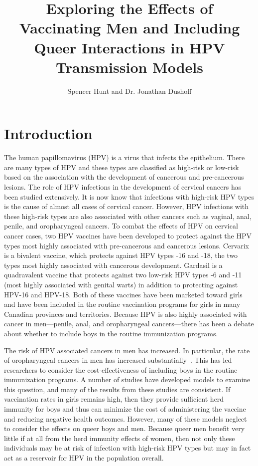 \documentclass[12pt]{article}
\title{Exploring the Effects of Vaccinating Men and Including Queer Interactions in HPV Transmission Models}
\author{Spencer Hunt and Dr. Jonathan Dushoff}
\begin{document}
\maketitle

\section{Introduction}

The human papillomavirus (HPV) is a virus that infects the epithelium.  There are many types of HPV and these types are classified as high-risk or low-risk based on the association with the development of cancerous and pre-cancerous lesions.  The role of HPV infections in the development of cervical cancers has been studied extensively.  It is now know that infections with high-risk HPV types is the cause of almost all cases of cervical cancer.  However, HPV infections with these high-risk types are also associated with other cancers such as vaginal, anal, penile, and oropharyngeal cancers.  To combat the effects of HPV on cervical cancer cases, two HPV vaccines have been developed to protect against the HPV types most highly associated with pre-cancerous and cancerous lesions. Cervarix is a bivalent vaccine, which protects against HPV types -16 and -18, the two types most highly associated with cancerous development.  Gardasil is a quadravalent vaccine that protects against two low-risk HPV types -6 and -11 (most highly associated with genital warts) in addition to protecting against HPV-16 and HPV-18.  Both of these vaccines have been marketed toward girls and have been included in the routine vaccination programs for girls in many Canadian provinces and territories.  Because HPV is also highly associated with cancer in men---penile, anal, and oropharyngeal cancers---there has been a debate about whether to include boys in the routine immunization programs.  

The risk of HPV associated cancers in men has increased. In particular, the rate of oropharyngeal cancers in men has increased substantially~\cite{}.  This has led researchers to consider the cost-effectiveness of including boys in the routine immunization programs.  A number of studies have developed models to examine this question, and many of the results from these studies are consistent.  If vaccination rates in girls remains high, then they provide sufficient herd immunity for boys and thus can minimize the cost of administering the vaccine and reducing negative health outcomes.  However, many of these models neglect to consider the effects on queer boys and men.  Because queer men benefit very little if at all from the herd immunity effects of women, then not only these individuals may be at risk of infection with high-risk HPV types but may in fact act as a reservoir for HPV in the population overall.  
\end{document}
